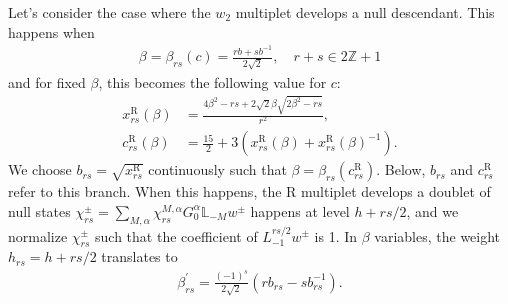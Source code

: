 \documentclass[12pt]{article}
\newcommand{\ie}{\begin{equation}\begin{aligned}}
\newcommand{\fe}{\end{aligned}\end{equation}}
\numberwithin{equation}{section}
\begin{document}

Let's consider the case where the $w_2$ multiplet develops a null descendant. This happens when 
\ie
\beta=\beta_{r s}(c)=\frac{r b+s b^{-1}}{2 \sqrt{2}}, \quad r+s\in 2 \mathbb{Z}+1
\fe
and for fixed $\beta$, this becomes the following value for $c$:
\ie
x_{r s}^{\mathrm{R}}(\beta) & =\frac{4 \beta^2-r s+2 \sqrt{2} \beta \sqrt{2 \beta^2-r s}}{r^2}, \\
c_{r s}^{\mathrm{R}}(\beta) & =\frac{15}{2}+3\left(x_{r s}^{\mathrm{R}}(\beta)+x_{r s}^{\mathrm{R}}(\beta)^{-1}\right) .
\fe
We choose $b_{rs}=\sqrt{x_{rs}^{\mathrm{R}}}$ continuously such that $\beta=\beta_{rs}(c_{rs}^{\mathrm{R}})$. Below, $b_{rs}$ and $c_{rs}^{\mathrm{R}}$ refer to this branch. When this happens, the R multiplet develops a doublet of null states $\chi_{rs}^\pm = \sum_{M,\alpha} \chi_{rs}^{M,\alpha} G_0^\alpha \mathbb{L}_{-M} w^\pm$ happens at level $h+rs/2$, and we normalize $\chi_{rs}^\pm$ such that the coefficient of $L_{-1}^{rs/2}w^\pm$ is 1. In $\beta$ variables, the weight $h_{rs}=h+rs/2$ translates to
\ie
\beta_{r s}^{\prime}=\frac{(-1)^s}{2 \sqrt{2}}\left(r b_{r s}-s b_{r s}^{-1}\right).
\fe
\end{document}
